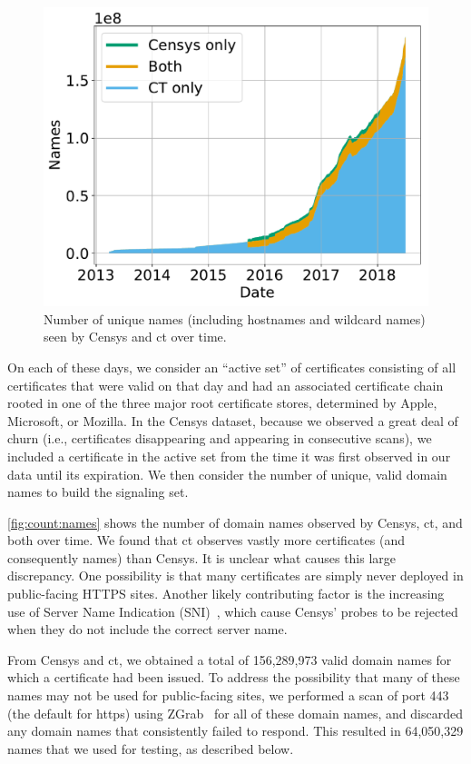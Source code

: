 \begin{figure}
  \centering
  \includegraphics[width=0.85\linewidth]{fig/name_count_valid}
  \caption{Number of unique names (including hostnames and wildcard names) seen
  by Censys and \ac{ct} over time.}
  \label{fig:count:names}
\end{figure}

On each of these days, we consider an ``active set'' of certificates consisting
of all certificates that were valid on that day and had an associated
certificate chain rooted in one of the three major root certificate stores,
determined by Apple, Microsoft, or Mozilla. In the Censys dataset, because we
observed a great deal of churn (i.e., certificates disappearing and appearing in
consecutive scans), we included a certificate in the active set from the time it
was first observed in our data until its expiration. We then consider the number
of unique, valid domain names to build the signaling set.

\autoref{fig:count:names} shows the number of domain names observed by Censys,
\ac{ct}, and both over time. We found that \ac{ct} observes vastly more
certificates (and consequently names) than Censys. It is unclear what causes
this large discrepancy. One possibility is that many certificates are simply
never deployed in public-facing HTTPS sites. Another likely contributing factor
is the increasing use of Server Name Indication (SNI)~\cite{rfc6066}, which
cause Censys' probes to be rejected when they do not include the correct server
name.

From Censys and \ac{ct}, we obtained a total of 156,289,973 valid domain names
for which a certificate had been issued. To address the possibility that many of
these names may not be used for public-facing sites, we performed a scan of port
443 (the default for \ac{https}) using ZGrab~\cite{durumeric2015search} for all
of these domain names, and discarded any domain names that consistently failed
to respond. This resulted in 64,050,329 names that we used for testing, as
described below.

